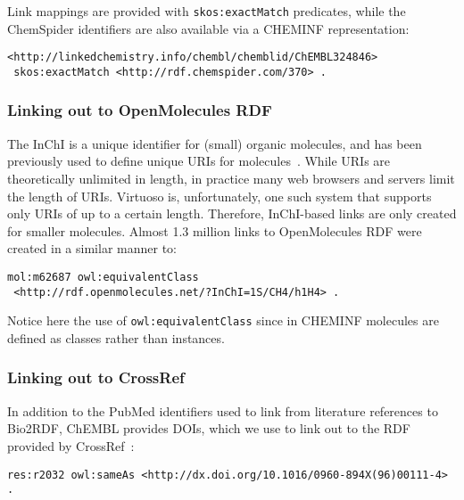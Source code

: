\documentclass[10pt]{bmc_article}
\newenvironment{bmcformat}{\begin{raggedright}\baselineskip20pt\sloppy\setboolean{publ}{false}}{\end{raggedright}\baselineskip20pt\sloppy}
\begin{document}
\begin{bmcformat}
Link mappings are provided with \verb+skos:exactMatch+ predicates, while the ChemSpider identifiers
are also available via a CHEMINF representation:
 
\begin{small}
\begin{verbatim}
<http://linkedchemistry.info/chembl/chemblid/ChEMBL324846>
 skos:exactMatch <http://rdf.chemspider.com/370> .
\end{verbatim}
\end{small}

\subsubsection*{Linking out to OpenMolecules RDF}

The InChI is a unique identifier for (small) organic molecules, and has been previously used
to define unique URIs for molecules~\cite{Bradley2009,Willighagen2011}. While URIs are theoretically unlimited in length,
in practice many web browsers and servers limit the length of URIs. Virtuoso is, unfortunately,
one such system that supports only URIs of up to a certain length. Therefore, InChI-based links are only created for smaller molecules. 
Almost 1.3 million links to OpenMolecules RDF were created in a similar manner to:

\begin{small}
\begin{verbatim}
mol:m62687 owl:equivalentClass
 <http://rdf.openmolecules.net/?InChI=1S/CH4/h1H4> .
\end{verbatim}
\end{small}

Notice here the use of \verb+owl:equivalentClass+ since in CHEMINF molecules are defined as
classes rather than instances.

\subsubsection*{Linking out to CrossRef}

In addition to the PubMed identifiers used to link from literature references to Bio2RDF,
ChEMBL provides DOIs, which we use to link out to the RDF provided by CrossRef~\cite{Bilder2011}:

\begin{small}
\begin{verbatim}
res:r2032 owl:sameAs <http://dx.doi.org/10.1016/0960-894X(96)00111-4> .
\end{verbatim}
\end{small}


\end{bmcformat}
\end{document}
